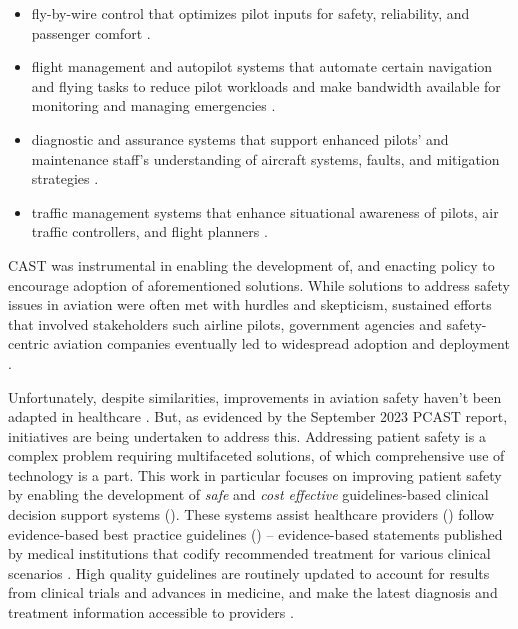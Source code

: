 \begin{itemize}
  \item fly-by-wire control that optimizes pilot inputs for safety, reliability,
    and passenger comfort \cite{FBWSkybraryUrl}.
  \item flight management and autopilot systems that automate certain navigation
    and flying tasks to reduce pilot workloads and make bandwidth available for monitoring and
    managing emergencies \cite{CockpitAutomationSkybraryURL}.
  \item diagnostic and assurance systems that support enhanced pilots' and
    maintenance staff's understanding of aircraft systems, faults, and
    mitigation strategies \cite{CockpitAutomationSkybraryURL}.
  \item traffic management systems that enhance situational awareness of
    pilots, air traffic controllers, and flight planners \cite{ATMSkybraryUrl,TCASUrl}.
\end{itemize}
CAST was instrumental in enabling the development of, and enacting policy to
encourage adoption of aforementioned solutions.
While solutions to address safety issues in aviation were often met with
hurdles and skepticism, sustained efforts that involved stakeholders such
airline pilots, government agencies and safety-centric aviation companies
eventually led to widespread adoption and deployment \cite{CASTSafetySkybrary}.

Unfortunately, despite similarities, improvements in aviation safety haven't
been adapted in healthcare \cite{GerstleJPS18}.
But, as evidenced by the September 2023 PCAST report, initiatives are being
undertaken to address this. Addressing patient safety is a complex problem
requiring multifaceted solutions, of which comprehensive use of technology is a part.
This work in particular focuses on improving patient safety by enabling
the development of \emph{safe} and \emph{cost effective} guidelines-based clinical decision
support systems (\CDSSs{}). These systems assist healthcare providers (\HCPs{}) follow
evidence-based best practice guidelines (\BPGs{}) -- evidence-based
statements published by medical institutions that codify recommended treatment
for various clinical scenarios \cite{FieldClinical90}. High quality guidelines are routinely updated to account for
 results from clinical trials and advances in medicine, and make the latest
 diagnosis and treatment information accessible to providers \cite{SteinbergNAP11}.

